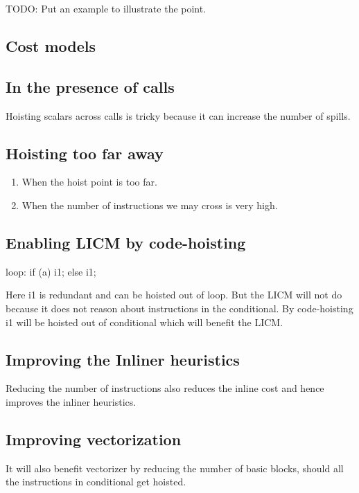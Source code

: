 \begin{section}
TODO: Put an example to illustrate the point.


\section{Cost models}
\subsection{In the presence of calls}
Hoisting scalars across calls is tricky because it can increase the
number of spills.

\subsection{Hoisting too far away}
\begin{enumerate}
\item When the hoist point is too far.
\item When the number of instructions we may cross is very high.
\end{enumerate}



\section{Enabling LICM by code-hoisting}
loop:
if (a)
  i1;
else
  i1;

Here i1 is redundant and can be hoisted out of loop. But the LICM will
not do because it does not reason about instructions in the
conditional.  By code-hoisting i1 will be hoisted out of conditional
which will benefit the LICM.

\section{Improving the Inliner heuristics}
Reducing the number of instructions also reduces the inline cost and
hence improves the inliner heuristics.

\section{Improving vectorization}
It will also benefit vectorizer by reducing the number
of basic blocks, should all the instructions in conditional get hoisted.

\end{section}


